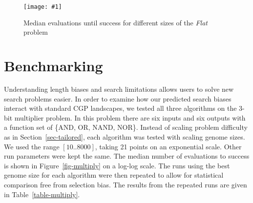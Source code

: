 \documentclass{sig-alternate}
\newcommand{\includegraphicsfit}[1]
{\texttt{[image: \#1]}}
\begin{document}
\begin{figure}
  \centering
  \includegraphicsfit{flat}
  \caption{Median evaluations until success for different sizes of the \emph{Flat} problem} 
  \label{fig-flat}
\end{figure}

\section{Benchmarking}
\label{sec-benchmarking}
Understanding length biases and search limitations allows users to
solve new search problems easier.  In order to examine how our predicted search biases
interact with standard CGP landscapes, we tested all three algorithms on the 3-bit
multiplier problem.  In this problem there are six inputs and six outputs with
a function set of \{AND, OR, NAND, NOR\}.  Instead of scaling problem difficulty
as in Section~\ref{sec-tailored}, each algorithm was tested with scaling genome
sizes.  We used the range $\left [ 10 .. 8000 \right ]$, taking 21 points on an
exponential scale.  Other run parameters were kept the same.
The median number of evaluations to success is shown in
Figure~\ref{fig-multiply} on a log-log scale.  The runs using the best genome size for each 
algorithm were then repeated to allow for statistical comparison free from selection bias.
The results from the repeated runs are given in Table~\ref{table-multiply}.
\end{document}
